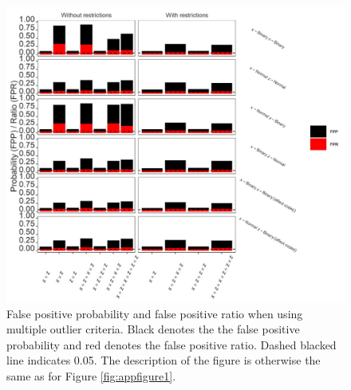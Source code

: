 \begin{figure}[hbt!]
\includegraphics[scale=0.95]{R/Analysis/Result/Figures/Figure1BSI.jpeg}
\centering
\caption{False positive probability and false positive ratio when using multiple outlier criteria. Black denotes the the false positive probability and red denotes the false positive ratio. Dashed blacked line indicates 0.05. The description of the figure is otherwise the same as for Figure \ref{fig:appfigure1}.
}
\label{fig:appfigure4}
\end{figure}
\begin{landscape}

\end{landscape}
